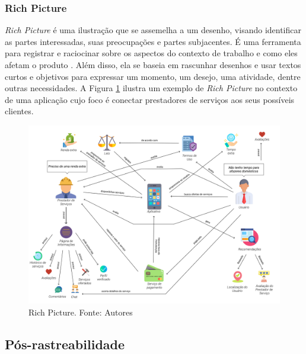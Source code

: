 \subsubsection{Rich Picture}

\label{sec:rich_picture}

\textit{Rich Picture} é uma ilustração que se assemelha a um desenho, visando identificar as partes interessadas, suas preocupações e partes subjacentes. É uma ferramenta para registrar e raciocinar sobre os aspectos do contexto de trabalho e como eles afetam o produto  \cite{10.1145/274430.274434}. Além disso, ela se baseia em rascunhar desenhos e usar textos curtos e objetivos para expressar um momento, um desejo, uma atividade, dentre outras necessidades. A Figura \ref{fig:rich_picture} ilustra um exemplo de \textit{Rich Picture} no contexto de uma aplicação cujo foco é conectar prestadores de serviços aos seus possíveis clientes.

\begin{figure}[H]
    \begin{center}
        \includegraphics[scale=0.25]{figuras/Embasamento/rp_geral_v2.png}
        \caption{{Rich Picture. Fonte: Autores}}
        \label{fig:rich_picture}
    \end{center}
\end{figure}



\subsection{Pós-rastreabilidade}

\label{sec:pos-rastreabilidade}

